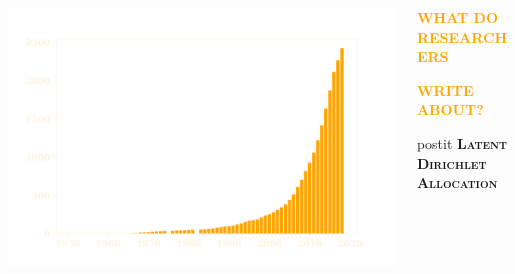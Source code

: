 \documentclass[usenames,dvipsnames,t]{beamer}
\newcommand*\circled[1]{\tikz[baseline=(char.base)]{
            \node[shape=circle,draw,inner sep=2pt] (char) {#1};}}
\begin{document}
\begin{columns}
\begin{column}{.33\linewidth}
\begin{center}
        \vspace{-.7cm}
        \includegraphics[width=.8\textwidth]{static/articles.png}
    \end{center}
\end{column}
\vrule width 3pt
\begin{column}{.33\linewidth}
    \begin{center}
        \textbf{\Large\textcolor{orange}{\circled{2} \textsc{WHAT DO RESEARCHERS}}}
        \vspace{.5cm}
    
        \textbf{\Large\textcolor{orange}{\textsc{WRITE ABOUT?}}}
    \end{center}
    \vspace{1cm}
    \centering
    \begin{minipage}{4cm}
        \begin{beamercolorbox}[ht=.7cm, sep=.2em, wd=9.3cm, rounded=true]{postit}
        \textcolor{solarizedBase03}{\small
         \textbf{\textsc{Latent Dirichlet Allocation}}}
        \end{beamercolorbox}
    \end{minipage}
    \vspace{1cm}

    \begin{center}
        
    \end{center}
    \vspace{1cm}

    \begin{center}
        
    \end{center}


\end{column}
\end{columns}
\end{document}
